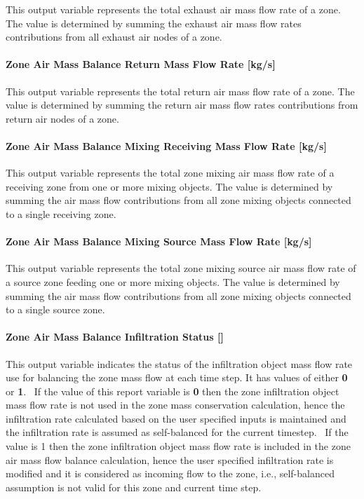 This output variable represents the total exhaust air mass flow rate of a zone. The value is determined by summing the exhaust air mass flow rates contributions from all exhaust air nodes of a zone.

\paragraph{Zone Air Mass Balance Return Mass Flow Rate {[}kg/s{]}}\label{zone-air-mass-balance-return-mass-flow-rate-kgs}

This output variable represents the total return air mass flow rate of a zone. The value is determined by summing the return air mass flow rates contributions from return air nodes of a zone.

\paragraph{Zone Air Mass Balance Mixing Receiving Mass Flow Rate {[}kg/s{]}}\label{zone-air-mass-balance-mixing-receiving-mass-flow-rate-kgs}

This output variable represents the total zone mixing air mass flow rate of a receiving zone from one or more mixing objects. The value is determined by summing the air mass flow contributions from all zone mixing objects connected to a single receiving zone.

\paragraph{Zone Air Mass Balance Mixing Source Mass Flow Rate {[}kg/s{]}}\label{zone-air-mass-balance-mixing-source-mass-flow-rate-kgs}

This output variable represents the total zone mixing source air mass flow rate of a source zone feeding one or more mixing objects. The value is determined by summing the air mass flow contributions from all zone mixing objects connected to a single source zone.

\paragraph{Zone Air Mass Balance Infiltration Status {[]}}\label{zone-air-mass-balance-infiltration-status}

This output variable indicates the status of the infiltration object mass flow rate use for balancing the zone mass flow at each time step. It has values of either \textbf{0} or \textbf{1}.~ If the value of this report variable is \textbf{0} then the zone infiltration object mass flow rate is not used in the zone mass conservation calculation, hence the infiltration rate calculated based on the user specified inputs is maintained and the infiltration rate is assumed as self-balanced for the current timestep.~ If the value is 1 then the zone infiltration object mass flow rate is included in the zone air mass flow balance calculation, hence the user specified infiltration rate is modified and it is considered as incoming flow to the zone, i.e., self-balanced assumption is not valid for this zone and current time step.

